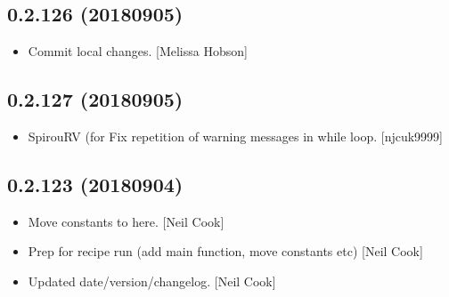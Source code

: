 \documentclass[a4paper,10pt,english]{report}
\begin{document}
\subsection{0.2.126 (2018\sphinxhyphen{}09\sphinxhyphen{}05)}
\label{\detokenize{misc/changelog:id357}}\begin{itemize}
\item {} 
Commit local changes. {[}Melissa Hobson{]}

\end{itemize}


\subsection{0.2.127 (2018\sphinxhyphen{}09\sphinxhyphen{}05)}
\label{\detokenize{misc/changelog:id358}}\begin{itemize}
\item {} 
SpirouRV (for  \sphinxhyphen{} Fix repetition of warning
messages in while loop. {[}njcuk9999{]}

\end{itemize}


\subsection{0.2.123 (2018\sphinxhyphen{}09\sphinxhyphen{}04)}
\label{\detokenize{misc/changelog:id359}}\begin{itemize}
\item {} 
Move  constants to here. {[}Neil Cook{]}

\item {} 
Prep  for recipe run (add main function, move constants
etc) {[}Neil Cook{]}

\item {} 
Updated date/version/changelog. {[}Neil Cook{]}

\end{itemize}
\end{document}
